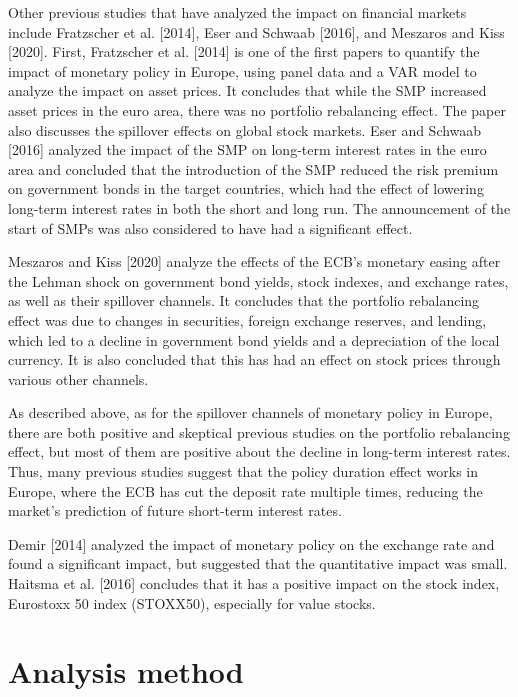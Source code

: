 \documentclass[12pt]{article}
\begin{document}
Other previous studies that have analyzed the impact on financial markets include Fratzscher et al. [2014], Eser and Schwaab [2016], and Meszaros and Kiss [2020].
First, Fratzscher et al. [2014] is one of the first papers to quantify the impact of monetary policy in Europe, using panel data and a VAR model to analyze the impact on asset prices.
It concludes that while the SMP increased asset prices in the euro area, there was no portfolio rebalancing effect.
The paper also discusses the spillover effects on global stock markets.
Eser and Schwaab [2016] analyzed the impact of the SMP on long-term interest rates in the euro area and concluded that the introduction of the SMP reduced the risk premium on government bonds in the target countries, which had the effect of lowering long-term interest rates in both the short and long run.
The announcement of the start of SMPs was also considered to have had a significant effect.

Meszaros and Kiss [2020] analyze the effects of the ECB's monetary easing after the Lehman shock on government bond yields, stock indexes, and exchange rates, as well as their spillover channels.
It concludes that the portfolio rebalancing effect was due to changes in securities, foreign exchange reserves, and lending, which led to a decline in government bond yields and a depreciation of the local currency.
It is also concluded that this has had an effect on stock prices through various other channels.

As described above, as for the spillover channels of monetary policy in Europe, there are both positive and skeptical previous studies on the portfolio rebalancing effect, but most of them are positive about the decline in long-term interest rates.
Thus, many previous studies suggest that the policy duration effect works in Europe, where the ECB has cut the deposit rate multiple times, reducing the market's prediction of future short-term interest rates.

Demir [2014] analyzed the impact of monetary policy on the exchange rate and found a significant impact, but suggested that the quantitative impact was small.
Haitsma et al. [2016] concludes that it has a positive impact on the stock index, Eurostoxx 50 index (STOXX50), especially for value stocks.

\newpage

\section{Analysis method}
\end{document}
